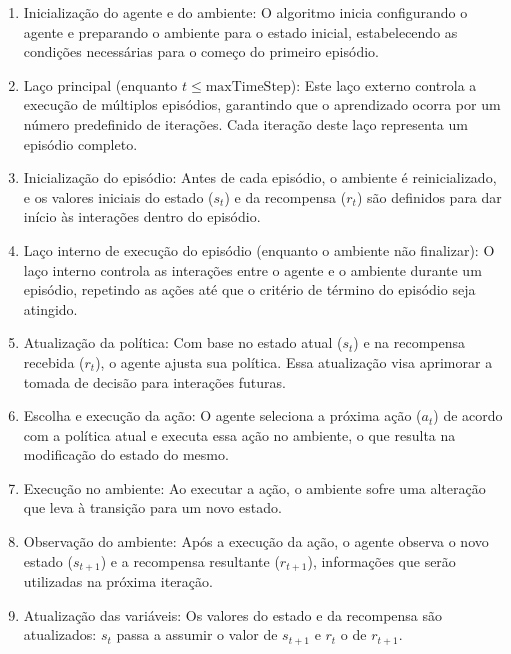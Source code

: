 \documentclass[
    12pt,                %
    openright,           %
    oneside,             %
    a4paper,             %
    english,             %
    spanish,             %
    brazil               %
]{ufscar}
\begin{document}
\begin{enumerate}
    \item Inicialização do agente e do ambiente: O algoritmo inicia configurando o agente e preparando o ambiente para o estado inicial, estabelecendo as condições necessárias para o começo do primeiro episódio.
    
    \item Laço principal (enquanto \( t \leq \text{maxTimeStep} \)): Este laço externo controla a execução de múltiplos episódios, garantindo que o aprendizado ocorra por um número predefinido de iterações. Cada iteração deste laço representa um episódio completo.
    
    \item Inicialização do episódio: Antes de cada episódio, o ambiente é reinicializado, e os valores iniciais do estado (\( s_t \)) e da recompensa (\( r_t \)) são definidos para dar início às interações dentro do episódio.
    
    \item Laço interno de execução do episódio (enquanto o ambiente não finalizar): O laço interno controla as interações entre o agente e o ambiente durante um episódio, repetindo as ações até que o critério de término do episódio seja atingido.
    
    \item Atualização da política: Com base no estado atual (\( s_t \)) e na recompensa recebida (\( r_t \)), o agente ajusta sua política. Essa atualização visa aprimorar a tomada de decisão para interações futuras.
    
    \item Escolha e execução da ação: O agente seleciona a próxima ação (\( a_t \)) de acordo com a política atual e executa essa ação no ambiente, o que resulta na modificação do estado do mesmo.
    
    \item Execução no ambiente: Ao executar a ação, o ambiente sofre uma alteração que leva à transição para um novo estado.
    
    \item Observação do ambiente: Após a execução da ação, o agente observa o novo estado (\( s_{t+1} \)) e a recompensa resultante (\( r_{t+1} \)), informações que serão utilizadas na próxima iteração.
    
    \item Atualização das variáveis: Os valores do estado e da recompensa são atualizados: \( s_t \) passa a assumir o valor de \( s_{t+1} \) e \( r_t \) o de \( r_{t+1} \).
    

\end{enumerate}
\end{document}
